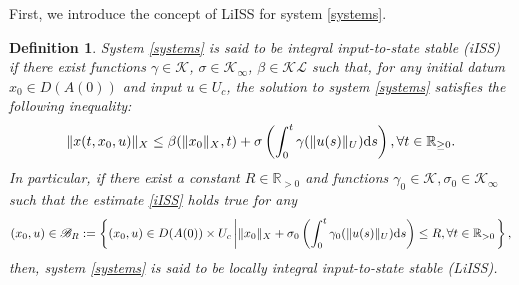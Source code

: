 \documentclass[onecolumn]{autart}
\newtheorem{definition}{Definition}
\newenvironment{proof of Prop.ODE}{{\it Proof of Proposition~\ref{Prop.ODE}:\enspace}}{\hfill $\blacksquare$\par}
\newenvironment{proof of PDE}{{\it Proof of Proposition \ref{Prop.8}:\enspace}}{\hfill $\blacksquare$\par}
\begin{document}
{%





%
%
%
%




First, we introduce  the concept of LiISS  for system \eqref{systems}.


\begin{definition}
	System \eqref{systems} is said to be integral input-to-state stable (iISS) if there {exist} functions $\gamma \in \mathcal{K}$, $\sigma\in\mathcal{K}_{\infty}$, $\beta\in \mathcal{K}\mathcal{L} $  such that, for any initial datum $x_{0}\in D(A(0)) $ and input ${u\in U_c}$, the solution {to} system \eqref{systems} satisfies the following inequality:
	\begin{align}\label{iISS}
		\|x(t, x_{0},  u)\|_{ X } \leq {\beta}(\|x_{0}\|_{ X } ,  t) + \sigma\left(\int^{t}_{0}\gamma(\|u(s)\|_{ U}){\rm{d}}s\right), \forall t\in\mathbb{R}_{\geq0}.
	\end{align}
	{In particular, if there {exist}  a constant  $R \in \mathbb{R}_ {>0}$ and functions $\gamma_0\in\mathcal{K}, \sigma_{0}\in\mathcal{K}_{\infty}$ such that the estimate \eqref{iISS}  holds true for any
		\begin{align*}({x}_0, u) \in
			\mathscr{B}_{R}: =\left\{ (x_{0},u) \in  D(A(0)) \times  U_c\left|  \|x_{0}\|_{ X }+\sigma_{0}\left(\int^{t}_{0}\gamma_0(\|u(s)\|_{ U}){\rm{d}}s\right) \leq R,\forall t\in \mathbb{R}_{>0}\right.\right\},
		\end{align*}
		then, system \eqref{systems} is said to be locally integral input-to-state stable (LiISS). }
\end{definition}

}
\end{document}
